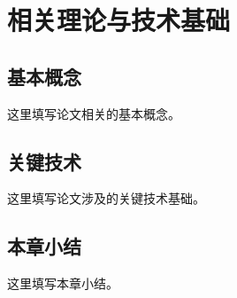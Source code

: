 \chapter{相关理论与技术基础}

\section{基本概念}

这里填写论文相关的基本概念。

\section{关键技术}

这里填写论文涉及的关键技术基础。

\section{本章小结}

这里填写本章小结。
